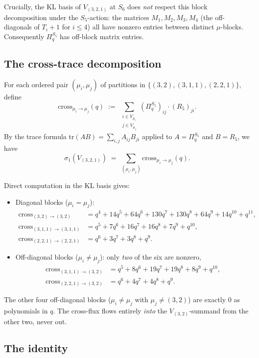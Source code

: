 \documentclass[11pt]{article}
\theoremstyle{definition}
\begin{document}
Crucially, the KL basis of $V_{(3,2,1)}$ at $S_6$ does \emph{not} respect this block decomposition under the $S_5$-action: the matrices $M_1, M_2, M_3, M_4$ (the off-diagonals of $T_i+1$ for $i \leq 4$) all have nonzero entries between distinct $\mu$-blocks. Consequently $\Pi_q^{S_5}$ has off-block matrix entries.

\subsection*{The cross-trace decomposition}

For each ordered pair $(\mu_i, \mu_j)$ of partitions in $\{(3,2), (3,1,1), (2,2,1)\}$, define
\[
\mathrm{cross}_{\mu_i \to \mu_j}(q) \;:=\; \sum_{\substack{i \in V_{\mu_i}\\ j \in V_{\mu_j}}} (\Pi_q^{S_5})_{ij} \cdot (R_5)_{ji}.
\]
By the trace formula $\mathrm{tr}(AB) = \sum_{i,j} A_{ij} B_{ji}$ applied to $A = \Pi_q^{S_5}$ and $B = R_5$, we have
\[
\sigma_1(V_{(3,2,1)}) \;=\; \sum_{(\mu_i, \mu_j)} \mathrm{cross}_{\mu_i \to \mu_j}(q).
\]

Direct computation in the KL basis gives:
\begin{itemize}[leftmargin=2em,topsep=0.2em,itemsep=0.1em]
\item Diagonal blocks ($\mu_i = \mu_j$):
\begin{align*}
\mathrm{cross}_{(3,2)\to(3,2)} &= q^4 + 14q^5 + 64q^6 + 130q^7 + 130q^8 + 64q^9 + 14q^{10} + q^{11},\\
\mathrm{cross}_{(3,1,1)\to(3,1,1)} &= q^5 + 7q^6 + 16q^7 + 16q^8 + 7q^9 + q^{10},\\
\mathrm{cross}_{(2,2,1)\to(2,2,1)} &= q^6 + 3q^7 + 3q^8 + q^9.
\end{align*}
\item Off-diagonal blocks ($\mu_i \neq \mu_j$): only \emph{two} of the six are nonzero,
\begin{align*}
\mathrm{cross}_{(3,1,1)\to(3,2)} &= q^5 + 8q^6 + 19q^7 + 19q^8 + 8q^9 + q^{10},\\
\mathrm{cross}_{(2,2,1)\to(3,2)} &= q^6 + 4q^7 + 4q^8 + q^9.
\end{align*}
\end{itemize}

The other four off-diagonal blocks ($\mu_i \neq \mu_j$ with $\mu_j \neq (3,2)$) are exactly $0$ as polynomials in $q$. The cross-flux flows entirely \emph{into} the $V_{(3,2)}$-summand from the other two, never out.

\subsection*{The identity}
\end{document}
